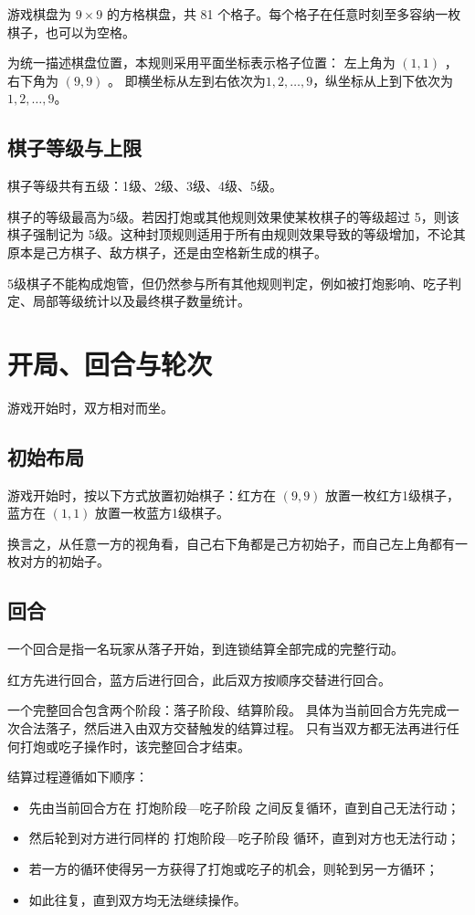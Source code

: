 \documentclass[12pt]{ctexart}
\begin{document}
游戏棋盘为 $9\times9$ 的方格棋盘，共 81 个格子。每个格子在任意时刻至多容纳一枚棋子，也可以为空格。

为统一描述棋盘位置，本规则采用平面坐标表示格子位置：
左上角为 $(1,1)$ ，右下角为 $(9,9)$ 。
即横坐标从左到右依次为$1,2,\dots,9$，纵坐标从上到下依次为$1,2,\dots,9$。

\subsection{棋子等级与上限}

棋子等级共有五级：1级、2级、3级、4级、5级。

棋子的等级最高为5级。若因打炮或其他规则效果使某枚棋子的等级超过 5，则该棋子强制记为 5级。这种封顶规则适用于所有由规则效果导致的等级增加，不论其原本是己方棋子、敌方棋子，还是由空格新生成的棋子。

5级棋子不能构成炮管，但仍然参与所有其他规则判定，例如被打炮影响、吃子判定、局部等级统计以及最终棋子数量统计。

\section{开局、回合与轮次}
游戏开始时，双方相对而坐。

\subsection{初始布局}

游戏开始时，按以下方式放置初始棋子：红方在 $(9,9)$ 放置一枚红方1级棋子，蓝方在 $(1,1)$ 放置一枚蓝方1级棋子。

换言之，从任意一方的视角看，自己右下角都是己方初始子，而自己左上角都有一枚对方的初始子。

\subsection{回合}

一个回合是指一名玩家从落子开始，到连锁结算全部完成的完整行动。

红方先进行回合，蓝方后进行回合，此后双方按顺序交替进行回合。

一个完整回合包含两个阶段：落子阶段、结算阶段。
具体为当前回合方先完成一次合法落子，然后进入由双方交替触发的结算过程。
只有当双方都无法再进行任何打炮或吃子操作时，该完整回合才结束。

结算过程遵循如下顺序：
\begin{itemize}
\item 先由当前回合方在 $\text{打炮阶段—吃子阶段}$ 之间反复循环，直到自己无法行动；
\item 然后轮到对方进行同样的 $\text{打炮阶段—吃子阶段}$ 循环，直到对方也无法行动；
\item 若一方的循环使得另一方获得了打炮或吃子的机会，则轮到另一方循环；
\item 如此往复，直到双方均无法继续操作。
\end{itemize}
\end{document}
